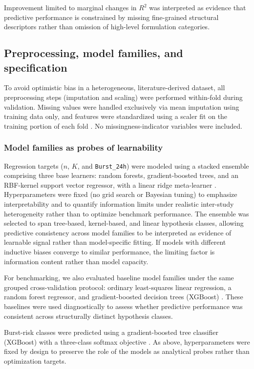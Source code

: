 \documentclass[preprint,12pt,authoryear]{elsarticle}
\begin{document}
Improvement limited to marginal changes in $R^2$ was interpreted as evidence that predictive performance is constrained by missing fine-grained structural descriptors rather than omission of high-level formulation categories.


\subsection{Preprocessing, model families, and specification}
To avoid optimistic bias in a heterogeneous, literature-derived dataset, all preprocessing steps (imputation and scaling) were performed within-fold during validation. Missing values were handled exclusively via mean imputation using training data only, and features were standardized using a scaler fit on the training portion of each fold \citep{Pedregosa2011Sklearn}. No missingness-indicator variables were included.

\subsubsection{Model families as probes of learnability}
Regression targets ($n$, $K$, and \texttt{Burst\_24h}) were modeled using a stacked ensemble comprising three base learners: random forests, gradient-boosted trees, and an RBF-kernel support vector regressor, with a linear ridge meta-learner \citep{Breiman2001RF,CortesVapnik1995SVM,HoerlKennard1970Ridge,Wolpert1992Stacked,Chen2016XGBoost}. Hyperparameters were fixed (no grid search or Bayesian tuning) to emphasize interpretability and to quantify information limits under realistic inter-study heterogeneity rather than to optimize benchmark performance. The ensemble was selected to span tree-based, kernel-based, and linear hypothesis classes, allowing predictive consistency across model families to be interpreted as evidence of learnable signal rather than model-specific fitting. If models with different inductive biases converge to similar performance, the limiting factor is information content rather than model capacity.

For benchmarking, we also evaluated baseline model families under the same grouped cross-validation protocol: ordinary least-squares linear regression, a random forest regressor, and gradient-boosted decision trees (XGBoost) \citep{Breiman2001RF,Chen2016XGBoost}. These baselines were used diagnostically to assess whether predictive performance was consistent across structurally distinct hypothesis classes.

Burst-risk classes were predicted using a gradient-boosted tree classifier (XGBoost) with a three-class softmax objective \citep{Chen2016XGBoost}. As above, hyperparameters were fixed by design to preserve the role of the models as analytical probes rather than optimization targets.
\end{document}
